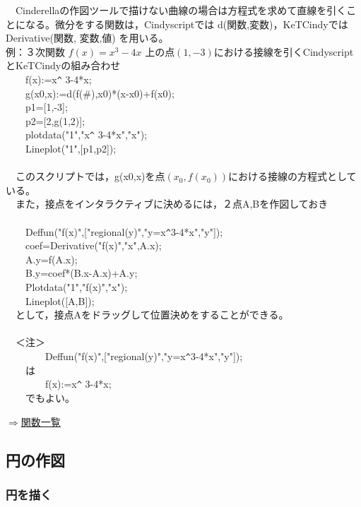 \documentclass[papersize,a4paper,12pt,uplatex]{jsarticle}
\begin{document}
　Cinderellaの作図ツールで描けない曲線の場合は方程式を求めて直線を引くことになる。微分をする関数は，Cindyscriptでは d(関数,変数)，KeTCindyではDerivative(関数, 変数,値) を用いる。\\

例：３次関数 $f(x)=x^3-4x$ 上の点$(1,-3)$における接線を引くCindyscriptとKeTCindyの組み合わせ\\
　　f(x):=x\verb|^| 3-4*x;\\
　　g(x0,x):=d(f(\#),x0)*(x-x0)+f(x0);\\
　　p1=[1,-3];\\
　　p2=[2,g(1,2)];\\
　　plotdata("1","x\verb|^| 3-4*x","x");\\
　　Lineplot("1",[p1,p2]);\\
　\\
　このスクリプトでは，g(x0,x)を点$(x_0,f(x_0))$における接線の方程式としている。\\
　また，接点をインタラクティブに決めるには，２点A,Bを作図しておき\\
　\\
　　Deffun("f(x)",["regional(y)","y=x\verb|^|3-4*x","y"]);\\
　　coef=Derivative("f(x)","x",A.x);\\
　　A.y=f(A.x);\\
　　B.y=coef*(B.x-A.x)+A.y;\\
　　Plotdata("1","f(x)","x");\\
　　Lineplot([A,B]);\\

　として，接点Aをドラッグして位置決めをすることができる。\\ 
　\\
　＜注＞\\
　　　　Deffun("f(x)",["regional(y)","y=x\verb|^|3-4*x","y"]);\\
　　は\\
　　　　f(x):=x\verb|^| 3-4*x;\\
　　でもよい。\\
\begin{flushright} \hyperlink{functionlist3d}{$\Rightarrow$関数一覧}\end{flushright}
\subsection{円の作図}
\subsubsection{円を描く}
\end{document}
